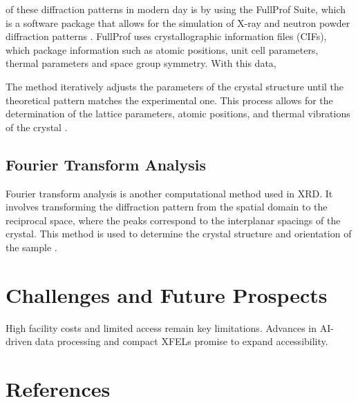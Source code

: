 \documentclass[aps,prb,twocolumn,superscriptaddress]{revtex4-2}
\begin{document}
of these diffraction patterns in modern day is by using the FullProf Suite, which
is a software package that allows for the simulation of X-ray and neutron powder
diffraction patterns \cite{RODRIGUEZCARVAJAL199355}. FullProf uses crystallographic
information files (CIFs), which package information such as atomic positions, 
unit cell parameters, thermal parameters and space group symmetry. With this data,


The method iteratively adjusts the parameters of the crystal structure until the
theoretical pattern matches the experimental one. This process allows for the
determination of the lattice parameters, atomic positions, and thermal
vibrations of the crystal \cite{Rietveld1969}. 

\subsection{Fourier Transform Analysis}
Fourier transform analysis is another computational method used in XRD. It
involves transforming the diffraction pattern from the spatial domain to the
reciprocal space, where the peaks correspond to the interplanar spacings of the
crystal. This method is used to determine the crystal structure and orientation
of the sample \cite{Warren1969}.



\section{Challenges and Future Prospects} \label{sec:challenges}
High facility costs and limited access remain key limitations. Advances in AI-driven data processing and compact XFELs
promise to expand accessibility.

\newpage
\section{References}


\end{document}
